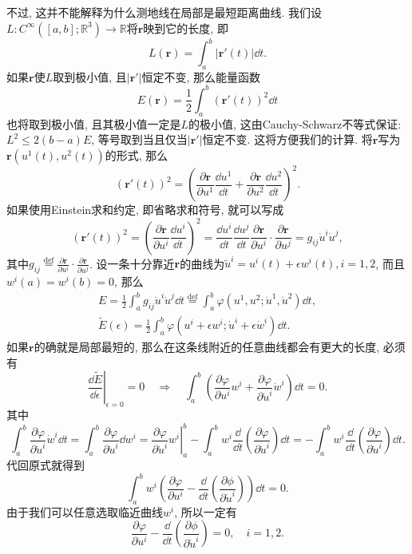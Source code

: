 \documentclass[./main.tex]{subfiles}
\begin{document}
不过, 这并不能解释为什么测地线在局部是最短距离曲线. 我们设\(L:C^{\infty}([a,b];\mathbb{R}^3)\to\mathbb{R}\)将\(\mathbf{r}\)映到它的长度, 即
\[
    L(\mathbf{r})=\int_a^b|\mathbf{r}'(t)|\dd t.
\]
如果\(\mathbf{r}\)使\(L\)取到极小值, 且\(|\mathbf{r}'|\)恒定不变, 那么能量函数
\[
    E(\mathbf{r})=\frac{1}{2}\int_a^b(\mathbf{r}'(t))^2\dd t
\]
也将取到极小值, 且其极小值一定是\(L\)的极小值, 这由Cauchy-Schwarz不等式保证: \(L^2\le2(b-a)E\), 等号取到当且仅当\(|\mathbf{r}'|\)恒定不变. 这将方便我们的计算. 将\(\mathbf{r}\)写为\(\mathbf{r}(u^1(t),u^2(t))\)的形式, 那么
\[
    (\mathbf{r}'(t))^2=\left(\frac{\partial\mathbf{r}}{\partial u^1}\frac{\dd u^1}{\dd t}+\frac{\partial\mathbf{r}}{\partial u^2}\frac{\dd u^2}{\dd t}\right)^2.
\]
如果使用Einstein求和约定, 即省略求和符号, 就可以写成
\[
    (\mathbf{r}'(t))^2=\left(\frac{\partial\mathbf{r}}{\partial u^i}\frac{\dd u^i}{\dd t}\right)^2=\frac{\dd u^i}{\dd t}\frac{\dd u^j}{\dd t}\frac{\partial\mathbf{r}}{\partial u^i}\cdot\frac{\partial\mathbf{r}}{\partial u^j}=g_{ij}\dot{u}^i\dot{u}^j,
\]
其中\(g_{ij}\overset{\text{def}}{=}\frac{\partial\mathbf{r}}{\partial u^i}\cdot\frac{\partial\mathbf{r}}{\partial u^j}\). 设一条十分靠近\(\mathbf{r}\)的曲线为\(\tilde{u}^i=u^i(t)+\epsilon w^i(t),i=1,2\), 而且\(w^i(a)=w^i(b)=0\), 那么
\begin{gather}\label{equ:4}
    E=\frac12\int_a^bg_{ij}\dot{u}^i\dot{u}^j\dd t\overset{\text{def}}{=}\int_a^b\varphi(u^1,u^2;\dot u^1,\dot u^2)\dd t,\\
    \tilde{E}(\epsilon)=\frac12\int_a^b\varphi(u^i+\epsilon w^i;\dot u^i+\epsilon\dot w^i)\dd t.\nonumber
\end{gather}
如果\(\mathbf{r}\)的确就是局部最短的, 那么在这条线附近的任意曲线都会有更大的长度, 必须有
\[
    \left.\frac{\dd\tilde E}{\dd\epsilon}\right|_{\epsilon=0}=0\quad\Longrightarrow\quad\int_a^b\left(\frac{\partial\varphi}{\partial u^i}w^i+\frac{\partial\varphi}{\partial\dot u^i}\dot w^i\right)\dd t=0.
\]
其中
\[
    \int_a^b \frac{\partial\varphi}{\partial\dot u^i}\dot w^i\dd t=\int_a^b\frac{\partial\varphi}{\partial\dot u^i}\dd w^i=\left.\frac{\partial\varphi}{\partial\dot u^i}w^i\right|_a^b-\int_a^bw^i\frac{\dd}{\dd t}\left(\frac{\partial\varphi}{\partial\dot u^i}\right)\dd t=-\int_a^bw^i\frac{\dd}{\dd t}\left(\frac{\partial\varphi}{\partial\dot u^i}\right)\dd t.
\]
代回原式就得到
\[
    \int_a^bw^i\left(\frac{\partial\varphi}{\partial u^i}-\frac{\dd}{\dd t}\left(\frac{\partial\phi}{\partial\dot u^i}\right)\right)\dd t=0.
\]
由于我们可以任意选取临近曲线\(w^i\), 所以一定有
\[
    \frac{\partial\varphi}{\partial u^i}-\frac{\dd}{\dd t}\left(\frac{\partial\phi}{\partial\dot u^i}\right)=0,\quad i=1,2.
\]
\end{document}
